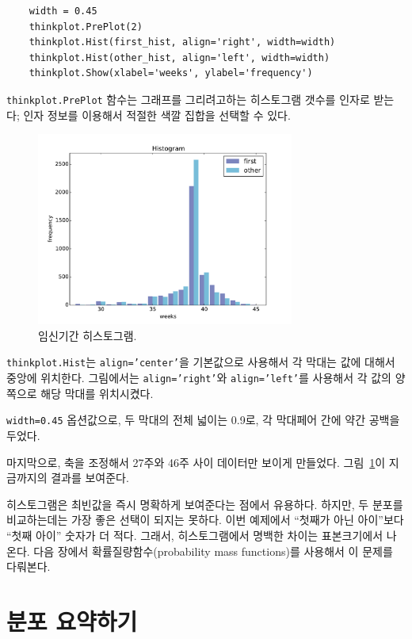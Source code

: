 \begin{verbatim}
    width = 0.45
    thinkplot.PrePlot(2)
    thinkplot.Hist(first_hist, align='right', width=width)
    thinkplot.Hist(other_hist, align='left', width=width)
    thinkplot.Show(xlabel='weeks', ylabel='frequency')
\end{verbatim}

{\tt thinkplot.PrePlot} 함수는 그래프를 그리려고하는 히스토그램 갯수를 인자로 받는다;
인자 정보를 이용해서 적절한 색깔 집합을 선택할 수 있다.


\begin{figure}
\centerline{\includegraphics[height=2.5in]{figs/first_nsfg_hist.pdf}}
\caption{임신기간 히스토그램.}
\label{first_nsfg_hist}
\end{figure}

{\tt thinkplot.Hist}는 {\tt align='center'}을 기본값으로 사용해서 
각 막대는 값에 대해서 중앙에 위치한다. 그림에서는 {\tt align='right'}와 {\tt align='left'}를
사용해서 각 값의 양쪽으로 해당 막대를 위치시켰다.

{\tt width=0.45} 옵션값으로, 두 막대의 전체 넓이는 0.9로, 각 막대페어 간에 약간 공백을 두었다.

마지막으로, 축을 조정해서 27주와 46주 사이 데이터만 보이게 만들었다. 
그림~\ref{first_nsfg_hist}이 지금까지의 결과를 보여준다.

히스토그램은 최빈값을 즉시 명확하게 보여준다는 점에서 유용하다.
하지만, 두 분포를 비교하는데는 가장 좋은 선택이 되지는 못하다. 
이번 예제에서 ``첫째가 아닌 아이''보다 ``첫째 아이'' 숫자가 더 적다. 
그래서, 히스토그램에서 명백한 차이는 표본크기에서 나온다. 다음 장에서 확률질량함수(probability mass functions)를 사용해서
이 문제를 다뤄본다. 


\section{분포 요약하기}
\label{mean}

